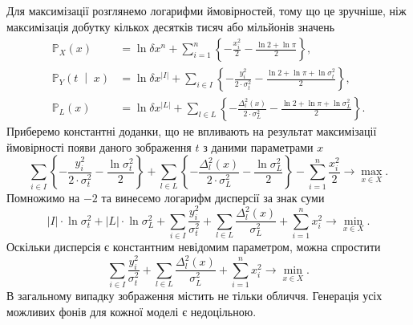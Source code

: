 Для максимізації розглянемо логарифми ймовірностей,
тому що це зручніше,
ніж максимізація добутку кількох десятків тисяч або мільйонів значень
\begin{equation*}
  \begin{split}
    \mathbb{P}_X\left( x \right)
    &= \ln{\delta x^n} +
        \sum_{i = 1}^n
        \left\{
          - \frac{x_i^2}{2}
          - \frac{\ln{2} + \ln{\pi}}{2}
        \right\}, \\
    \mathbb{P}_Y\left( t \;\middle|\; x \right)
    &= \ln{\delta x^{\left| I \right|}} +
        \sum_{i \in I}
        \left\{
          - \frac{y_i^2}{2 \cdot \sigma^2_t}
          - \frac{\ln{2} + \ln{\pi} + \ln{\sigma^2_t}}{2}
        \right\}, \\
    \mathbb{P}_L\left( x \right)
    &= \ln{\delta x^{\left| L \right|}} +
        \sum_{l \in L}
        \left\{
          - \frac{\Delta_l^2\left( x \right)}{2 \cdot \sigma_L^2}
          - \frac{\ln{2} + \ln{\pi} + \ln{\sigma_L^2}}{2}
        \right\}.
  \end{split}
\end{equation*}
Приберемо константні доданки,
що не впливають на результат максимізації ймовірності
появи даного зображення $t$ з даними параметрами $x$
\begin{equation*}
  \sum_{i \in I}
    \left\{
      - \frac{y_i^2}{2 \cdot \sigma^2_t}
      - \frac{\ln{\sigma^2_t}}{2}
    \right\}
  +
  \sum_{l \in L}
    \left\{
      - \frac{\Delta_l^2\left( x \right)}{2 \cdot \sigma_L^2}
      - \frac{\ln{\sigma_L^2}}{2}
    \right\}
  - \sum_{i = 1}^n \frac{x_i^2}{2}
  \to \max\limits_{x \in X}.
\end{equation*}
Помножимо на $-2$ та винесемо логарифм дисперсії за знак суми
\begin{equation}\label{eq:minimize}
  \left| I \right| \cdot \ln{\sigma^2_t}
  + \left| L \right| \cdot \ln{\sigma_L^2}
  + \sum_{i \in I} \frac{y_i^2}{\sigma^2_t}
  + \sum_{l \in L} \frac{\Delta_l^2\left( x \right)}{\sigma_L^2}
  + \sum_{i = 1}^n x_i^2
  \to \min\limits_{x \in X}.
\end{equation}
Оскільки дисперсія є константним невідомим параметром,
можна спростити
\begin{equation}\label{eq:minimize}
  \sum_{i \in I} \frac{y_i^2}{\sigma^2_t}
  + \sum_{l \in L} \frac{\Delta_l^2\left( x \right)}{\sigma_L^2}
  + \sum_{i = 1}^n x_i^2
  \to \min\limits_{x \in X}.
\end{equation}
В загальному випадку зображення містить не тільки обличчя.
Генерація усіх можливих фонів для кожної моделі є недоцільною.
